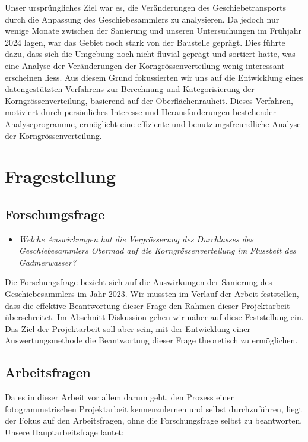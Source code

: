\documentclass[12pt]{article}
\begin{document}
    Unser ursprüngliches Ziel war es, die Veränderungen des Geschiebetransports durch die Anpassung des Geschiebesammlers zu analysieren.
    Da jedoch nur wenige Monate zwischen der Sanierung und unseren Untersuchungen im Frühjahr 2024 lagen, war das Gebiet noch stark von der Baustelle geprägt.
    Dies führte dazu, dass sich die Umgebung noch nicht fluvial geprägt und sortiert hatte, was eine Analyse der Veränderungen der Korngrössenverteilung wenig interessant erscheinen liess.
    Aus diesem Grund fokussierten wir uns auf die Entwicklung eines datengestützten Verfahrens zur Berechnung und Kategorisierung der Korngrössenverteilung, basierend auf der Oberflächenrauheit.
    Dieses Verfahren, motiviert durch persönliches Interesse und Herausforderungen bestehender Analyseprogramme, ermöglicht eine effiziente und benutzungsfreundliche Analyse der Korngrössenverteilung.

\section{Fragestellung}\label{sec:fragestellung}

    \subsection{Forschungsfrage}\label{subsec:forschungsfrage}

    \begin{itemize}
        \item \textit{Welche Auswirkungen hat die Vergrösserung des Durchlasses des Geschiebesammlers Obermad auf die Korngrössenverteilung im Flussbett des Gadmerwasser?}
    \end{itemize}

    Die Forschungsfrage bezieht sich auf die Auswirkungen der Sanierung des Geschiebesammlers im Jahr 2023. Wir mussten im Verlauf der Arbeit feststellen, dass die effektive Beantwortung dieser Frage den Rahmen dieser Projektarbeit überschreitet. Im Abschnitt Diskussion gehen wir näher auf diese Feststellung ein. Das Ziel der Projektarbeit soll aber sein, mit der Entwicklung einer Auswertungsmethode die Beantwortung dieser Frage theoretisch zu ermöglichen.

    \subsection{Arbeitsfragen}\label{subsec:arbeitsfragen}

        Da es in dieser Arbeit vor allem darum geht, den Prozess einer fotogrammetrischen Projektarbeit kennenzulernen und selbst durchzuführen, liegt der Fokus auf den Arbeitsfragen, ohne die Forschungsfrage selbst zu beantworten.
        Unsere Hauptarbeitsfrage lautet:
\end{document}
